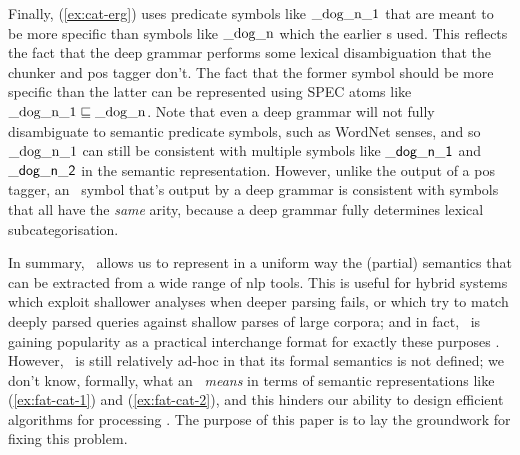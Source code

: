 Finally, (\ref{ex:cat-erg}) uses predicate symbols like
$\mathrm{\_dog\_n\_1}$ that are meant to be more specific than 
symbols like $\mathrm{\_dog\_n}$ which the earlier \rmrs s used.
This reflects the fact that the deep grammar performs some lexical
disambiguation that the chunker and {\sc pos} tagger don't.  The fact
that the former symbol should be more specific than the latter can be
represented using SPEC atoms like $\mathrm{\_dog\_n\_1}\sqsubseteq
\mathrm{\_dog\_n}$.
Note that even a deep grammar will not fully disambiguate to
semantic predicate symbols, such as WordNet senses, and so
$\mathrm{\_dog\_n\_1}$ can still be consistent with multiple symbols
like $\mathsf{\_dog\_n\_1}$ and $\mathsf{\_dog\_n\_2}$ in the semantic
representation.  However, unlike the output of a
{\sc pos} tagger, an \rmrs\ symbol that's output by a deep grammar is
consistent 
with symbols that all have the {\em same} arity, because a deep grammar
fully determines lexical subcategorisation.

In summary, \rmrs\ allows us to represent in a uniform way
the (partial) semantics
that can be extracted from a wide range of {\sc nlp} tools.
This is useful for hybrid systems which exploit shallower
analyses when deeper parsing fails, or which try to match
deeply parsed queries against shallow parses of large corpora;
and in fact, \rmrs\ is gaining popularity as a practical interchange
format for exactly these purposes \cite{copestake:2003}.
However, \rmrs\ is still relatively ad-hoc in that its
formal semantics is
not defined; we don't know, formally, what an \rmrs\ \emph{means} in
terms of semantic representations like (\ref{ex:fat-cat-1}) and
(\ref{ex:fat-cat-2}), and this hinders our ability to design efficient
algorithms for processing \rmrs. The purpose of this paper is to lay
the groundwork for fixing this problem.


